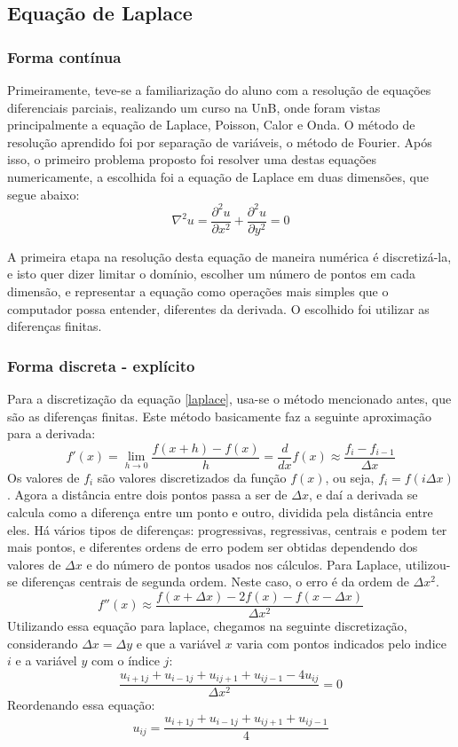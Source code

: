 \documentclass[journal]{IEEEtran}
\begin{document}
\subsection{Equação de Laplace}
\subsubsection{Forma contínua}
Primeiramente, teve-se a familiarização do aluno com a resolução de equações diferenciais parciais, realizando um curso na UnB, onde foram vistas principalmente a equação de Laplace, Poisson, Calor e Onda. O método de resolução aprendido foi por separação de variáveis, o método de Fourier. Após isso, o primeiro problema proposto foi resolver uma destas equações numericamente, a escolhida foi a equação de Laplace em duas dimensões, que segue abaixo:
\begin{equation}
\nabla^2 u=\frac{\partial^2 u}{\partial x^2}+\frac{\partial^2 u}{\partial y^2}=0\label{laplace}
\end{equation}

A primeira etapa na resolução desta equação de maneira numérica é discretizá-la, e isto quer dizer limitar o domínio, escolher um número de pontos em cada dimensão, e representar a equação como operações mais simples que o computador possa entender, diferentes da derivada. O escolhido foi utilizar as diferenças finitas.
\subsubsection{Forma discreta - explícito}
Para a discretização da equação \ref{laplace}, usa-se o método mencionado antes, que são as diferenças finitas. Este método basicamente faz a seguinte aproximação para a derivada:
\begin{equation}
f'(x)=\lim_{h\rightarrow 0}\frac{f(x+h)-f(x)}{h}=\frac{d}{dx}f(x)\approx \frac{f_i-f_{i-1}}{\Delta x}
\end{equation}
Os valores de $f_i$ são valores discretizados da função $f(x)$, ou seja, $f_i=f(i\Delta x)$. Agora a distância entre dois pontos passa a ser de $\Delta x$, e daí a derivada se calcula como a diferença entre um ponto e outro, dividida pela distância entre eles. Há vários tipos de diferenças: progressivas, regressivas, centrais e podem ter mais pontos, e diferentes ordens de erro podem ser obtidas dependendo dos valores de $\Delta x$ e do número de pontos usados nos cálculos. Para Laplace, utilizou-se diferenças centrais de segunda ordem. Neste caso, o erro é da ordem de $\Delta x^2$.
\begin{equation}
f''(x)\approx \frac{f(x+\Delta x)-2f(x)-f(x-\Delta x)}{\Delta x^2}
\end{equation}
Utilizando essa equação para laplace, chegamos na seguinte discretização, considerando $\Delta x=\Delta y$ e que a variável $x$ varia com pontos indicados pelo indice $i$ e a variável $y$ com o índice $j$:
\begin{equation}
\frac{u_{i+1j}+u_{i-1j}+u_{ij+1}+u_{ij-1}-4u_{ij}}{\Delta x^2}=0
\end{equation}
Reordenando essa equação:
\begin{equation}
  u_{ij}=\frac{u_{i+1j}+u_{i-1j}+u_{ij+1}+u_{ij-1}}{4} \label{laplace_discreta}
\end{equation}
\end{document}
